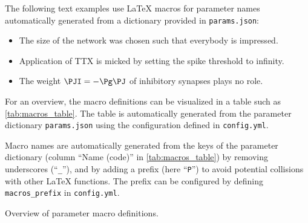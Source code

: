 \documentclass[10pt,a4paper,american]{article}
\begin{document}
The following text examples use LaTeX macros for parameter names automatically generated from a dictionary provided in \texttt{params.json}:
\begin{itemize}
\item The size \PN of the network was chosen such that everybody is impressed.
\item Application of TTX is micked by setting the spike threshold \PVth to infinity.
\item The weight $\PJI=-\Pg\PJ$ of inhibitory synapses plays no role.
\end{itemize}
For an overview, the macro definitions can be visualized in a table such as \cref{tab:macros_table}.
The table is automatically generated from the parameter dictionary \texttt{params.json} using the configuration defined in \texttt{config.yml}.
\par
Macro names are automatically generated from the keys of the parameter dictionary (column ``Name (code)'' in \cref{tab:macros_table}) by removing underscores (``\verb+_+''), and by adding a prefix (here ``\verb+P+'') to avoid potential collisions with other LaTeX functions. The prefix can be configured by defining \verb+macros_prefix+ in \texttt{config.yml}.
\begin{table}[ht!]
\begin{center}
  \parbox{0.8\linewidth}{       %
    \small%
    \centering%
    \renewcommand{\arraystretch}{1.5}%
    \noindent%
    \caption{Overview of parameter macro definitions.}
    \label{tab:macros_table}
  }
\end{center}
\end{table}
\end{document}
